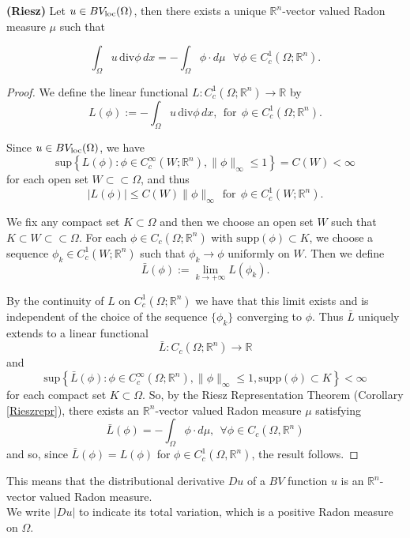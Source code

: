 \begin{theorem} \label{RieszBV} {\bf (Riesz)} Let $u \in BV_{\rm loc}(\Omega)$, then there exists a unique $\mathbb{R}^{n}$-vector valued Radon measure $\mu$ such that

\[ \int_{\Omega} u\, \mathrm{div}\phi\,dx = - \int_{\Omega} \phi \cdot d\mu   \   \  \ \forall \phi \in C_{c}^{1}(\Omega; \mathbb{R}^{n}). \]
\end{theorem}
\begin{proof} We define the linear functional $L : C_{c}^{1}(\Omega; \mathbb{R}^{n}) \to \mathbb{R}$ by
\[ L(\phi) := -\int_{\Omega} u\, \mathrm{div}\phi \,dx, \ \ \text{for} \ \ \phi \in C_{c}^{1}(\Omega; \mathbb{R}^{n}). \]

Since $u \in BV_{\rm loc}(\Omega)$, we have
\[ \mathrm{sup}\left \{ L(\phi) : \phi \in C_{c}^{\infty}(W; \mathbb{R}^{n}), \|\phi\|_{\infty} \le 1 \right \} = C(W) < \infty\]
for each open set $W \subset \subset \Omega$, and thus
\[ |L(\phi)| \le C(W) \|\phi\|_{\infty} \  \ \text{for} \  \ \phi \in C^{1}_{c}(W ; \mathbb{R}^{n}). \]

We fix any compact set $K \subset \Omega$ and then we choose an open set $W$ such that $K \subset W \subset \subset \Omega$. For each $\phi \in C_{c}(\Omega ; \mathbb{R}^{n})$ with $\mathrm{supp}(\phi) \subset K$, we choose a sequence $\phi_{k} \in C^{1}_{c}(W ; \mathbb{R}^{n})$ such that $\phi_{k} \to \phi$ uniformly on $W$. Then we define
\[ \bar L(\phi) := \lim_{k \to +\infty} L(\phi_{k}). \]

By the continuity of $L$ on $C^{1}_{c}(\Omega ; \mathbb{R}^{n})$ we have that this limit exists and is independent of the choice of the sequence $\{ \phi_{k} \}$ converging to $\phi$. Thus $\bar L$ uniquely extends to a linear functional 
\[ \bar L : C_{c}(\Omega ; \mathbb{R}^{n}) \to \mathbb{R}  \]
and
\[ \mathrm{sup}\left \{ \bar L (\phi) : \phi \in C_{c}^{\infty}(\Omega ; \mathbb{R}^{n}), \|\phi\|_{\infty} \le 1, \mathrm{supp}(\phi) \subset K \right \} < \infty \]
for each compact set $K \subset \Omega$. So, by the Riesz Representation Theorem (Corollary \ref{Rieszrepr}), there exists an $\mathbb{R}^{n}$-vector valued Radon measure $\mu$ satisfying
\[ \bar L (\phi) = - \int_{\Omega} \phi \cdot d\mu,   \    \ \forall \phi \in C_{c}(\Omega,\mathbb{R}^{n}) \]
and so, since $\bar L (\phi) = L(\phi)$ for $\phi \in C^{1}_{c}(\Omega,\mathbb{R}^{n})$, the result follows. 
\end{proof}

This means that the distributional derivative $Du$ of a $BV$ function $u$ is an $\mathbb{R}^{n}$-vector valued Radon measure.
\\
We write $|Du|$ to indicate its total variation, which is a positive Radon measure on $\Omega$.


